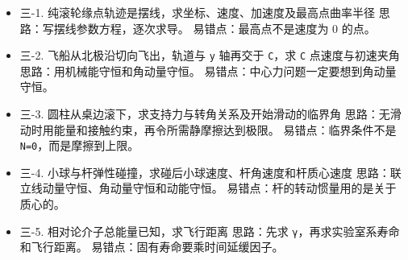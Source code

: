 \documentclass[12pt,a4paper]{ctexart}
\begin{document}
\begin{itemize}

\item 三-1. 纯滚轮缘点轨迹是摆线，求坐标、速度、加速度及最高点曲率半径 思路：写摆线参数方程，逐次求导。 易错点：最高点不是速度为 0 的点。

\end{itemize}

\begin{itemize}

\item 三-2. 飞船从北极沿切向飞出，轨道与 \texttt{y} 轴再交于 \texttt{C}，求 \texttt{C} 点速度与初速夹角 思路：用机械能守恒和角动量守恒。 易错点：中心力问题一定要想到角动量守恒。

\end{itemize}

\begin{itemize}

\item 三-3. 圆柱从桌边滚下，求支持力与转角关系及开始滑动的临界角 思路：无滑动时用能量和接触约束，再令所需静摩擦达到极限。 易错点：临界条件不是 \texttt{N=0}，而是摩擦到上限。

\end{itemize}

\begin{itemize}

\item 三-4. 小球与杆弹性碰撞，求碰后小球速度、杆角速度和杆质心速度 思路：联立线动量守恒、角动量守恒和动能守恒。 易错点：杆的转动惯量用的是关于质心的。

\end{itemize}

\begin{itemize}

\item 三-5. 相对论介子总能量已知，求飞行距离 思路：先求 \texttt{γ}，再求实验室系寿命和飞行距离。 易错点：固有寿命要乘时间延缓因子。

\end{itemize}
\end{document}
